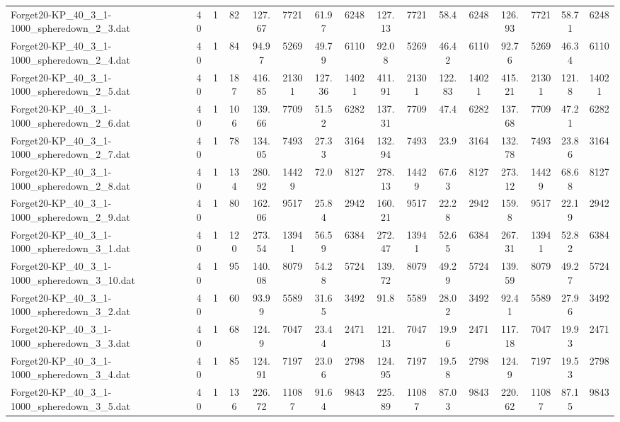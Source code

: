 \begin{sidewaystable}[!ht]
{\begin{tabular}{lccccccccccccccc}
Forget20-KP\_40\_3\_1-1000\_spheredown\_2\_3.dat & 40 & 1 & 82 & 127.67 & 7721 & 61.97 & 6248 & 127.13 & 7721 &  \textcolor{blue2}{58.4} & 6248 & 126.93 & 7721 & 58.71 & 6248 \\
Forget20-KP\_40\_3\_1-1000\_spheredown\_2\_4.dat & 40 & 1 & 84 & 94.97 & 5269 & 49.79 & 6110 & 92.08 & 5269 & 46.42 & 6110 & 92.76 & 5269 &  \textcolor{blue2}{46.34} & 6110 \\
Forget20-KP\_40\_3\_1-1000\_spheredown\_2\_5.dat & 40 & 1 & 187 & 416.85 & 21301 & 127.36 & 14021 & 411.91 & 21301 & 122.83 & 14021 & 415.21 & 21301 &  \textcolor{blue2}{121.8} & 14021 \\
Forget20-KP\_40\_3\_1-1000\_spheredown\_2\_6.dat & 40 & 1 & 106 & 139.66 & 7709 & 51.52 & 6282 & 137.31 & 7709 & 47.4 & 6282 & 137.68 & 7709 &  \textcolor{blue2}{47.21} & 6282 \\
Forget20-KP\_40\_3\_1-1000\_spheredown\_2\_7.dat & 40 & 1 & 78 & 134.05 & 7493 & 27.33 & 3164 & 132.94 & 7493 & 23.9 & 3164 & 132.78 & 7493 &  \textcolor{blue2}{23.86} & 3164 \\
Forget20-KP\_40\_3\_1-1000\_spheredown\_2\_8.dat & 40 & 1 & 134 & 280.92 & 14429 & 72.0 & 8127 & 278.13 & 14429 &  \textcolor{blue2}{67.63} & 8127 & 273.12 & 14429 & 68.68 & 8127 \\
Forget20-KP\_40\_3\_1-1000\_spheredown\_2\_9.dat & 40 & 1 & 80 & 162.06 & 9517 & 25.84 & 2942 & 160.21 & 9517 & 22.28 & 2942 & 159.8 & 9517 &  \textcolor{blue2}{22.19} & 2942 \\
Forget20-KP\_40\_3\_1-1000\_spheredown\_3\_1.dat & 40 & 1 & 120 & 273.54 & 13941 & 56.59 & 6384 & 272.47 & 13941 &  \textcolor{blue2}{52.65} & 6384 & 267.31 & 13941 & 52.82 & 6384 \\
Forget20-KP\_40\_3\_1-1000\_spheredown\_3\_10.dat & 40 & 1 & 95 & 140.08 & 8079 & 54.28 & 5724 & 139.72 & 8079 & 49.29 & 5724 & 139.59 & 8079 &  \textcolor{blue2}{49.27} & 5724 \\
Forget20-KP\_40\_3\_1-1000\_spheredown\_3\_2.dat & 40 & 1 & 60 & 93.99 & 5589 & 31.65 & 3492 & 91.8 & 5589 & 28.02 & 3492 & 92.41 & 5589 & 27.96 & 3492 \\
Forget20-KP\_40\_3\_1-1000\_spheredown\_3\_3.dat & 40 & 1 & 68 & 124.9 & 7047 & 23.44 & 2471 & 121.13 & 7047 & 19.96 & 2471 & 117.18 & 7047 & 19.93 & 2471 \\
Forget20-KP\_40\_3\_1-1000\_spheredown\_3\_4.dat & 40 & 1 & 85 & 124.91 & 7197 & 23.06 & 2798 & 124.95 & 7197 & 19.58 & 2798 & 124.9 & 7197 & 19.53 & 2798 \\
Forget20-KP\_40\_3\_1-1000\_spheredown\_3\_5.dat & 40 & 1 & 136 & 226.72 & 11087 & 91.64 & 9843 & 225.89 & 11087 & 87.03 & 9843 & 220.62 & 11087 & 87.15 & 9843 \\

\end{tabular}}
\end{sidewaystable}
